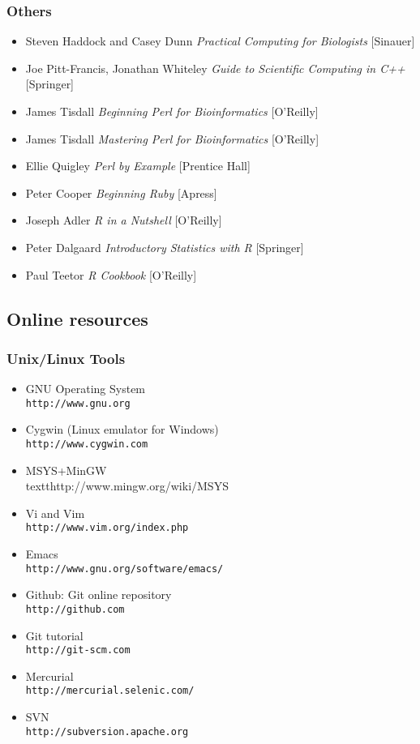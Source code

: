 \documentclass[ChapterTOCs,krantz2]{krantz} %
\begin{document}
\subsubsection{Others}
\begin{itemize}
\item Steven Haddock and Casey Dunn \emph{Practical Computing for Biologists} [Sinauer]
\item Joe Pitt-Francis, Jonathan Whiteley \emph{Guide to Scientific Computing in C++} [Springer]
\item James Tisdall \emph{Beginning Perl for Bioinformatics} [O'Reilly]
\item James Tisdall \emph{Mastering Perl for Bioinformatics} [O'Reilly]
\item Ellie Quigley \emph{Perl by Example} [Prentice Hall]
\item Peter Cooper \emph{Beginning Ruby} [Apress]
\item Joseph Adler \emph{R in a Nutshell} [O'Reilly]
\item Peter Dalgaard \emph{Introductory Statistics with R} [Springer]
\item Paul Teetor \emph{R Cookbook} [O'Reilly]
\end{itemize}

\subsection{Online resources}
\subsubsection{Unix/Linux Tools}
\begin{itemize}
\item GNU Operating System\\\texttt{http://www.gnu.org}
\item Cygwin (Linux emulator for Windows)\\\texttt{http://www.cygwin.com}
\item MSYS+MinGW \\textt{http://www.mingw.org/wiki/MSYS}

\item Vi and Vim\\ \texttt{http://www.vim.org/index.php}
\item Emacs\\ \texttt{http://www.gnu.org/software/emacs/}
\item Github: Git online repository\\ \texttt{http://github.com}
\item Git tutorial \\\texttt{http://git-scm.com}
\item Mercurial \\\texttt{http://mercurial.selenic.com/}
\item SVN \\\texttt{http://subversion.apache.org}
\end{itemize}
\end{document}
